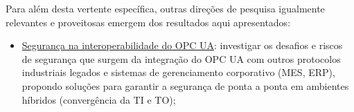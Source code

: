     Para além desta vertente específica, outras direções de pesquisa igualmente relevantes e proveitosas emergem dos resultados aqui apresentados:

    \begin{itemize}
        \item \underline{Segurança na interoperabilidade do OPC UA}: investigar os desafios e riscos de segurança que surgem da integração do OPC UA com outros protocolos industriais legados e sistemas de gerenciamento corporativo (MES, ERP), propondo soluções para garantir a segurança de ponta a ponta em ambientes híbridos (convergência da TI e TO);

\end{itemize}
